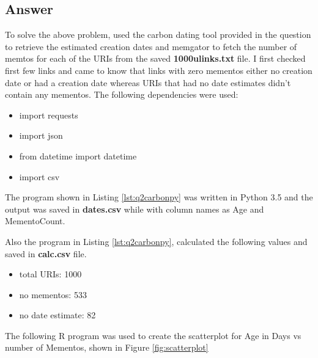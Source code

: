\documentclass[letterpaper,11pt]{article}
\begin{document}
\subsection*{Answer}
To solve the above problem, used the carbon dating tool \cite{carbondateref} provided in the question to retrieve the estimated creation dates and memgator to fetch the number of memtos for each of the URIs from the saved \textbf{1000ulinks.txt} file. I first checked first few links and came to know that links with zero mementos either no creation date or had a creation date whereas URIs that had no date estimates didn't contain any mementos. 
The following dependencies were used:
\begin{itemize}
  \item import requests
  \item import json
  \item from datetime import datetime
  \item import csv
  
\end{itemize}  

The program shown in Listing \ref{lst:q2carbonpy} was written in Python 3.5 and the output was saved in \textbf{dates.csv} while with column names as Age and MementoCount.


\clearpage
Also the program in Listing \ref{lst:q2carbonpy}, calculated the following values and saved in \textbf{calc.csv} file.
\begin{itemize}
  \item total URIs:	     1000
  \item no mementos:      533
  \item no date estimate: 82
\end{itemize}

The following R \cite{scatref} program was used to create the scatterplot  for Age in Days vs number of Mementos, shown in Figure \ref{fig:scatterplot}
\end{document}
